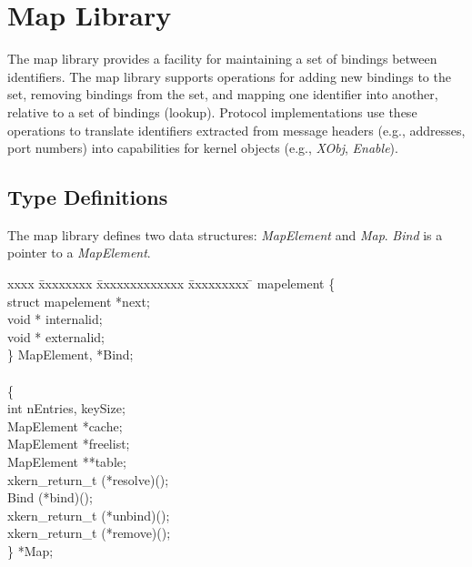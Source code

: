 % 
%
%

\section{Map Library}

The map library provides a facility for maintaining a set of bindings
between identifiers.  The map library supports operations for
adding new bindings to the set, removing bindings from the set, and
mapping one identifier into another, relative to a set of bindings (lookup).
Protocol implementations use these operations to translate identifiers
extracted from message headers (e.g., addresses, port numbers) into
capabilities for kernel objects (e.g., {\em XObj}, {\em Enable}).

\subsection{Type Definitions}

The map library defines two data structures: {\em MapElement}
and {\em Map}. {\em Bind} is a pointer to a {\em MapElement}.
\medskip

\begin{tabbing}
xxxx \= xxxxxxxx \= xxxxxxxxxxxxx \= xxxxxxxxx \= \kill
{} mapelement \{\\
\>\>  {\sem struct mapelement} \>\>*next;\\
\>\>  {\sem void *} \>internalid;\\
\>\>  {\sem void *} \>externalid;\\
\>\} {\bold MapElement}, *{\bold Bind};\\
\\
 \{\\
\>\>  {\sem int} \>nEntries, keySize;\\
\>\>  {\sem MapElement}  \>*cache;\\
\>\>  {\sem MapElement}  \>*freelist;\\
\>\>  {\sem MapElement}  \>**table;\\
\>\>  {\sem xkern\_return\_t} \>(*resolve)();\\
\>\>  {\sem Bind} \>(*bind)();\\
\>\>  {\sem xkern\_return\_t} \>(*unbind)();\\
\>\>  {\sem xkern\_return\_t} \>(*remove)();\\
\>\} *{\bold Map};
\end{tabbing}

